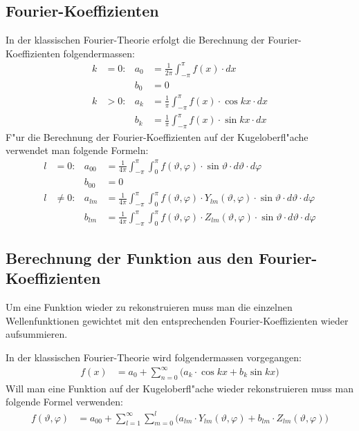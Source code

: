 \begin{refsection}
\subsection{Fourier-Koeffizienten}
In der klassischen Fourier-Theorie erfolgt die Berechnung der 
Fourier-Koeffizienten folgendermassen:
\begin{align*}
k&= 0: & a_{0} &= \frac{1}{2\pi} \int_{-\pi}^\pi f(x) \cdot dx
\\
&  & b_{0} &= 0
\\
k& > 0: & a_{k} &= \frac{1}{\pi} \int_{-\pi}^\pi f(x) \cdot \cos kx \cdot dx
\\
& & b_{k} &= \frac{1}{\pi} \int_{-\pi}^\pi f(x) \cdot \sin kx \cdot dx
\end{align*}
F"ur die Berechnung der Fourier-Koeffizienten auf der Kugeloberfl"ache 
verwendet man folgende Formeln:
\begin{align*}
l&=0: & a_{00} &= \frac{1}{4\pi} \int_{-\pi}^\pi \int_{0}^\pi f(\vartheta,\varphi) \cdot \sin\vartheta \cdot d\vartheta \cdot d\varphi
\\
&  & b_{00} &= 0
\\
l&\ne 0: & a_{lm} &= \frac{1}{4\pi} \int_{-\pi}^\pi \int_{0}^\pi f(\vartheta,\varphi) \cdot Y_{lm} (\vartheta, \varphi) \cdot \sin\vartheta \cdot d\vartheta \cdot d\varphi
\\
&  & b_{lm} &= \frac{1}{4\pi} \int_{-\pi}^\pi \int_{0}^\pi f(\vartheta,\varphi) \cdot Z_{lm} (\vartheta, \varphi) \cdot \sin\vartheta \cdot d\vartheta \cdot d\varphi
\end{align*}

\subsection{Berechnung der Funktion aus den Fourier-Koeffizienten}
Um eine Funktion wieder zu rekonstruieren muss man die einzelnen 
Wellenfunktionen gewichtet mit den entsprechenden Fourier-Koeffizienten 
wieder aufsummieren.

In der klassischen Fourier-Theorie wird folgendermassen vorgegangen:
\begin{equation}
\begin{aligned}
f(x)&=a_0 + \sum_{n=0}^\infty \Big( a_k \cdot \cos kx + b_k \sin kx \Big)
\end{aligned}
\end{equation}
Will man eine Funktion auf der Kugeloberfl"ache wieder rekonstruieren 
muss man folgende Formel verwenden:
\begin{equation}
\begin{aligned}
f(\vartheta, \varphi) &= a_{00} + \sum_{l=1}^\infty \sum_{m=0}^l \Big( a_{lm} \cdot Y_{lm}(\vartheta, \varphi) + b_{lm} \cdot Z_{lm}(\vartheta, \varphi) \Big)
\end{aligned}
\end{equation}

\end{refsection}
